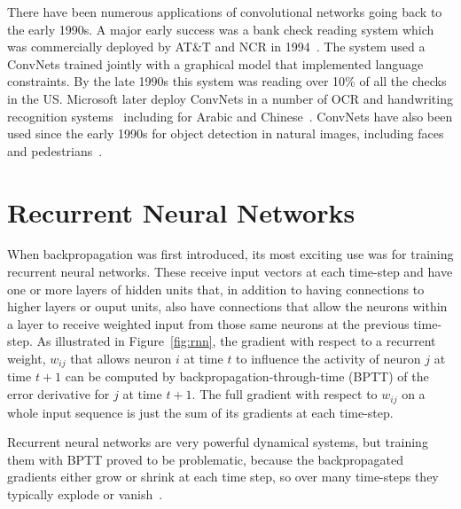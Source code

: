 \documentclass[10pts]{article}
\begin{document}
There have been numerous applications of convolutional networks going
back to the early 1990s. A major early success
was a bank check
reading system which was commercially deployed by AT\&T and NCR in
1994~\cite{lecun-98}. The system used a ConvNets trained jointly with
a graphical model that implemented language constraints. By the late
1990s this system was reading over 10\% of all the checks in the
US. Microsoft later deploy ConvNets in a number of OCR and handwriting
recognition
systems~\cite{simard-03,chellapilla-ist-06,chellapilla-iwfhr-06b}
including for Arabic and
Chinese~\cite{abdulkader-iwfhr-06,chellapilla-iwfhr-06a}. ConvNets
have also been used since the early 1990s for object detection in
natural images, including faces and
pedestrians~\cite{vaillant-monrocq-lecun-94,garcia-delakis-04,osadchy-07,nasse-09,sermanet-cvpr-13}.




\section{Recurrent Neural Networks}
\label{sec:rnn}

When backpropagation was first introduced, its most exciting use was for
training recurrent neural networks. These receive input vectors at each
time-step and have one or more layers of hidden units that, in addition to
having connections to higher layers or ouput units, also have connections
that allow the neurons within a layer to receive weighted input from those
same neurons at the previous time-step.  As illustrated in
Figure~\ref{fig:rnn}, the gradient with respect to a recurrent
weight, $w_{ij}$ that allows neuron $i$ at time $t$ to influence the
activity of neuron $j$ at time $t+1$ can be computed by
backpropagation-through-time (BPTT) of the error derivative for $j$ at time
$t+1$. The full gradient with respect to $w_{ij}$ on a whole input sequence is just the
sum of its gradients at each time-step.

Recurrent neural networks are very powerful dynamical systems, but training
them with BPTT proved to be problematic, because the backpropagated
gradients either grow or shrink at each time step, so over many time-steps
they typically explode or
vanish~\citep{Hochreiter91-small,Bengio-et-al-TNN1994}.
\end{document}

